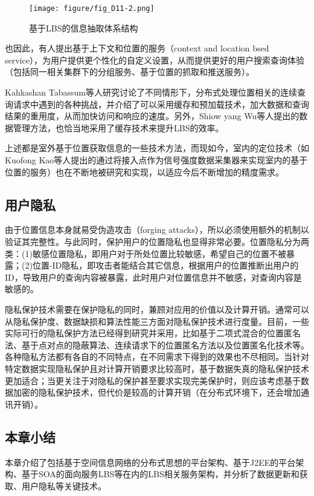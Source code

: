 \documentclass{article}
\begin{document}
\begin{CJK}{UTF8}{gbsn}
	\begin{figure}[htbp]
		\centering
		\texttt{[image: figure/fig\_D11-2.png]}
		\caption{基于LBS的信息抽取体系结构}
		\label{fig:D11-2-1}
	\end{figure}

  也因此，有人提出基于上下文和位置的服务（context and location bsed service）\cite{D05}，为用户提供更个性化的自定义设置，从而提供更好的用户搜索查询体验（包括同一相关集群下的分组服务\cite{D05}、基于位置的抓取和推送服务\cite{D04}）。

  Kahkashan Tabassum等人研究讨论了不同情形下，分布式处理位置相关的连续查询请求中遇到的各种挑战\cite{D08}，并介绍了可以采用缓存和预加载技术，加大数据和查询结果的重用度，从而加快访问和响应的速度。另外，Shiow yang Wu等人提出的数据管理方法\cite{D06}，也恰当地采用了缓存技术来提升LBS的效率。

  上述都是室外基于位置获取信息的一些技术方法，而现如今，室内的定位技术（如Kuofong Kao等人提出的通过将接入点作为信号强度数据采集器来实现室内的基于位置的服务\cite{D03}）也在不断地被研究和实现，以适应今后不断增加的精度需求。

	\subsection{用户隐私}
  由于位置信息本身就易受伪造攻击（forging attacks），所以必须使用额外的机制以验证其完整性\cite{P04}。与此同时，保护用户的位置隐私也显得非常必要。位置隐私分为两类\cite{P02}：(1)敏感位置隐私，即用户对于所处位置比较敏感，希望自己的位置不被暴露；(2)位置-ID隐私，即攻击者能结合其它信息，根据用户的位置推断出用户的ID，导致用户的查询内容被暴露，此时用户对位置信息并不敏感，对查询内容是敏感的。

  隐私保护技术需要在保护隐私的同时，兼顾对应用的价值以及计算开销。通常可以从隐私保护度、数据缺损和算法性能三方面对隐私保护技术进行度量\cite{P01}。目前，一些实际可行的隐私保护方法已经得到研究并采用，比如基于二项式混合的位置匿名法\cite{P03}、基于点对点的隐蔽算法\cite{P05}、连续请求下的位置匿名方法\cite{P02}以及位置匿名化技术\cite{P01}等。各种隐私方法都有各自的不同特点，在不同需求下得到的效果也不尽相同。当针对特定数据实现隐私保护且对计算开销要求比较高时，基于数据失真的隐私保护技术更加适合；当更关注于对隐私的保护甚至要求实现完美保护时，则应该考虑基于数据加密的隐私保护技术，但代价是较高的计算开销（在分布式环境下，还会增加通讯开销）\cite{P01}。

	\subsection{本章小结}
  本章介绍了包括基于空间信息网络的分布式思想的平台架构、基于J2EE的平台架构、基于SOA的面向服务LBS等在内的LBS相关服务架构，并分析了数据更新和获取、用户隐私等关键技术。



\end{CJK}
\end{document}

